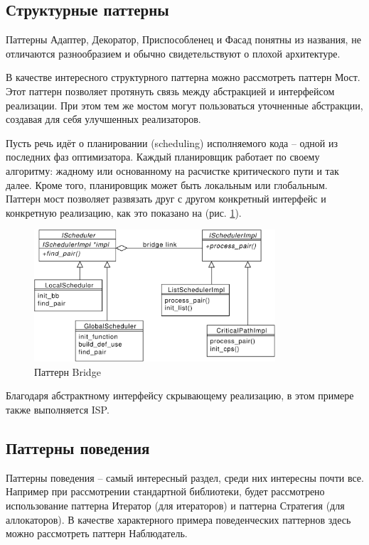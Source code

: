 \documentclass[a4paper,12pt,oneside]{book}
\begin{document}
\subsection{Структурные паттерны}

Паттерны Адаптер, Декоратор, Приспособленец и Фасад понятны из названия, не отличаются разнообразием и обычно свидетельствуют о плохой архитектуре.

В качестве интересного структурного паттерна можно рассмотреть паттерн Мост. Этот паттерн позволяет протянуть связь между абстракцией и интерфейсом реализации. При этом тем же мостом могут пользоваться уточненные абстракции, создавая для себя улучшенных реализаторов.

Пусть речь идёт о планировании (scheduling) исполняемого кода -- одной из последних фаз оптимизатора. Каждый планировщик работает по своему алгоритму: жадному или основанному на расчистке критического пути и так далее. Кроме того, планировщик может быть локальным или глобальным. Паттерн мост позволяет развязать друг с другом конкретный интерфейс и конкретную реализацию, как это показано на (рис. \ref{fig:bridge_pattern}).

\begin{figure}[h!]
\centering
\includegraphics[width=0.8\textwidth]{illustrations/sched-bridge-crop.pdf}
\caption{Паттерн Bridge}
\label{fig:bridge_pattern}
\end{figure}

Благодаря абстрактному интерфейсу скрывающему реализацию, в этом примере также выполняется ISP.

\subsection{Паттерны поведения}

Паттерны поведения -- самый интересный раздел, среди них интересны почти все. Например при рассмотрении стандартной библиотеки, будет рассмотрено использование паттерна Итератор (для итераторов) и паттерна Стратегия (для аллокаторов). В качестве характерного примера поведенческих паттернов здесь можно рассмотреть паттерн Наблюдатель.
\end{document}
